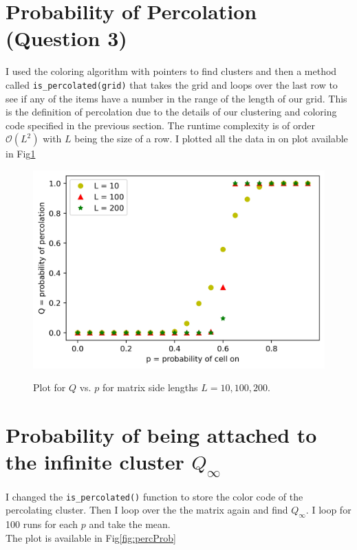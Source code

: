 \documentclass[12pt]{article}
\begin{document}
	\section{Probability of Percolation (Question 3)}
	I used the coloring algorithm with pointers to find clusters and then a method called \texttt{is\_percolated(grid)} that takes the grid and loops over the last
	row to see if any of the items have a number in the range of the length of our grid. This is the definition of percolation due to the details of
	our clustering and coloring code specified in the previous section. The runtime complexity is of order $\mathcal{O}(L^2)$ with $L$ being the 
	size of a row.
	I plotted all the data in on plot available in Fig\ref{fig:Perc}
	\begin{figure}[h!]
		\centering
		\includegraphics[width=0.9\linewidth]{../p3/percs.jpg}
		\label{fig:Perc}
		\caption{Plot for $Q$ vs. $p$ for matrix side lengths $L = 10, 100, 200$.}
	\end{figure}
	
	\section{Probability of being attached to the infinite cluster $Q_\infty$}
	I changed the \texttt{is\_percolated()} function to store the color code of the percolating cluster. Then I 
	loop over the the matrix again and find $Q_\infty$. I loop for 100 runs for each $p$ and take the mean.\\
	The plot is available in Fig\ref{fig:percProb}
	
\end{document}

